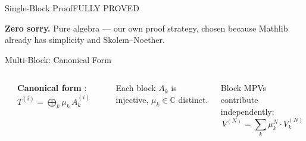 \documentclass[aspectratio=169,10pt]{beamer}
\begin{document}
\begin{frame}{Single-Block Proof\quad\textcolor{leangreen}{FULLY PROVED \checkmark}}
    \vspace{0.1em}
    \begin{center}
        {\small \textcolor{leangreen}{\textbf{Zero sorry.}} Pure algebra --- our own proof strategy, chosen because
            Mathlib already has simplicity and Skolem--Noether.}
    \end{center}
\end{frame}

\begin{frame}{Multi-Block: Canonical Form}
    \vspace{-0.5em}
    \begin{columns}[T]
        \begin{center}
        \end{center}

        \textbf{Canonical form} \cite{Cirac2021Matrix}:
        $T^{(i)} = \bigoplus_k \mu_k\, A_k^{(i)}$

        \vspace{0.2em}
        Each block $A_k$ is injective, $\mu_k\in\mathbb{C}$ distinct.

        \vspace{0.3em}
        Block MPVs contribute independently:
        \begin{equation*}
            V^{(N)} = \textstyle\sum_k \mu_k^N \cdot V_k^{(N)}
        \end{equation*}


\end{columns}
\end{frame}
\end{document}

